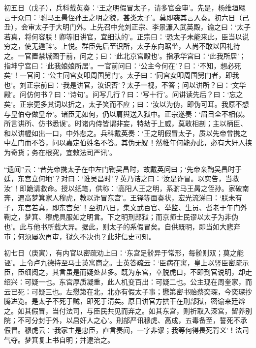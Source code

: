\documentclass[]{article}
\begin{document}
初五日（戊子），兵科戴英奏：`王之明假冒太子，请多官会审'。先是，杨维垣飏言于众曰：`驸马王昺侄孙王之明之貌，甚类太子'。莫即袭其言入奏。初六日（己丑），会审太子于大明门外。上先召中允刘正宗、李景濂入武英殿，谕之曰：`太子若真，将何容朕！卿等旧讲官，宜细认的'。正宗曰：`恐太子未能来此，臣当以说穷之，使无遁辞'。上悦。群臣先后至识所，太子东向踞坐，人尚不敢以囚礼待之。一官置禁城图于前，问之；曰：`此北京宫殿也'。指承华宫曰：`此我所居'；指坤宁宫曰：`此我娘娘所居'。一官前问曰：`公主今何在'？曰：`不知，想必死矣'！一官问：`公主同宫女叩周国舅门'。太子曰：`同宫女叩周国舅门者，即我也'。刘正宗前曰：`我是讲官，汝识否'？太子一视，不答；问以讲所？曰：`文华殿'。问仿何书？曰：`诗句'。问写几行？曰：`写十行'。问讲读先后？曰：`忘之矣'。正宗更多其词以折之，太子笑而不应；曰：`汝以为伪，即伪可耳。我原不想与皇伯夺做皇帝'。诸臣无如何，仍以肩舆送入狱中。正宗遂奏：`眉目全不相似。所言讲所、仿书悉误'。时诸内侍皆谓非妄，特劫于上威，莫敢相剖；主以柄臣、和以讲幄如出一口，中外悲之。兵科戴英奏：`王之明假冒太子，质以先帝曾携之中左门而不答，问以嘉定伯姓名不答。其伪无疑！然稚年何能办此，必有大奸人挟为奇货；务在根究，宜敕法司严讯'。

``遗闻''云：`昔先帝携太子在中左门鞫吴昌时，故戴英问曰；`先帝亲鞫吴昌时于廷，东宫立何地'？对曰：`谁吴昌时'？英乃诘之曰：`汝是诈冒。以实告，当救汝'！即跪请救命。授以纸笔，供称：`高阳人王之明，系驸马王昺之侄孙。家破南奔，遇高梦箕家人穆虎，教以诈冒东宫'。王铎等面奏状，宏光流涕曰：`朕未有子，东宫若真，即东宫矣'！至初八日，集文武百官、举监、生员、耆老于午门外鞫之，梦箕、穆虎具服如之明言。下之明刑部狱；而京师士民谬以太子为非伪也'。此与他书所载大异。据此，则太子的系假冒矣。自供既明，即当如大悲弃市；何须屡次再审，狱久不决也？此非信史可知。

初七日（庚寅），有内官以密疏劝上曰：`东宫足骱异于常形，每骱则双；莫之能诬'。上令卢九德持至马士英寓商之。士英答疏云：`臣病在寓，皇上以竖臣密疏示臣，臣细阅之，其言虽是而疑处甚多。既为东宫，幸脱虎口，不即到官说明，却走绍兴：可疑一也。东宫厚质凝重，此人机变百出：可疑二也。公主现在周奎家，而云已死：可疑三也。左懋第在北，北亦有假太子事；懋第密书贻蔡奕琛，今奕琛抄腾进览。是太子不死于贼，即死于清矣。原日讲官方拱干在刑部狱，密谕来廷辨之。如其假冒，当付法司，与臣民共见而弃之。如其东宫，则祈取入深宫，留养别院；不可分封于外，以启奸人之心'。刑部严讯穆虎、高成，五毒备至，誓死不承假冒。穆虎云：`我家主是忠臣，直言奏闻，一字非谬；我等何得畏死背义'！法司气夺。梦箕复上书自明；并逮治之。
\end{document}
